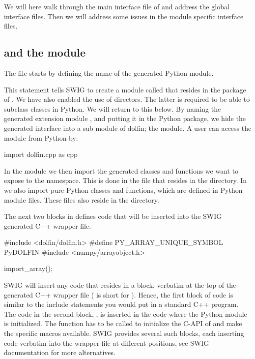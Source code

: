 We will here walk through the main interface file of  and address the global interface files. Then we will address some issues in the module specific interface files.\par

\subsection{ and the  module}
The file  starts by defining the name of the generated Python module.
\begin{c++}
\end{c++}
This statement tells SWIG to create a module called  that resides in the package of . We have also enabled the use of directors. The latter is required to be able to subclass \dolfin classes in Python. We will return to this below. By naming the generated extension module , and putting it in the  Python package, we hide the generated interface into a sub module of dolfin; the  module. A user can access the  module from Python by:
\begin{python}
import dolfin.cpp as cpp
\end{python}
In the  module we then import the generated classes and functions we want to expose to the  namespace. This is done in the  file that resides in the  directory. In  we also import pure Python classes and functions, which are defined in Python module files. These files also reside in the  directory.\par

The next two blocks in  defines code that will be inserted into the SWIG generated C++ wrapper file.
\begin{c++}
#include <dolfin/dolfin.h>
#define PY_ARRAY_UNIQUE_SYMBOL PyDOLFIN
#include <numpy/arrayobject.h>

import_array();
\end{c++}
SWIG will insert any code that resides in a \emp{\%\{$\ldots$\}\%} block, verbatim at the top of the generated C++ wrapper file (\emp{\%\{$\ldots$\}\%} is short for ). Hence, the first block of code is similar to the include statements you would put in a standard C++ program. The code in the second block, , is inserted in the code where the Python module is initialized. The  function has to be called to initialize the C-API of \numpy and make the \numpy specific macros available. SWIG provides several such blocks, each inserting code verbatim into the wrapper file at different positions, see SWIG documentation for more alternatives\cite{www:swig}.\par

